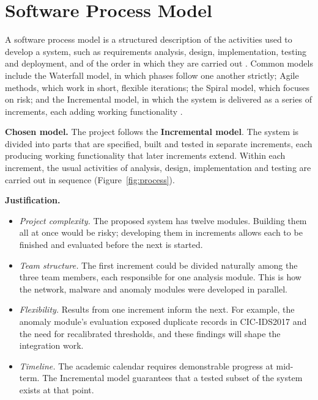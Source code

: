 \section{Software Process Model}

A software process model is a structured description of the activities used to develop a system, such as requirements analysis, design, implementation, testing and deployment, and of the order in which they are carried out \cite{sommerville2016se}. Common models include the Waterfall model, in which phases follow one another strictly; Agile methods, which work in short, flexible iterations; the Spiral model, which focuses on risk; and the Incremental model, in which the system is delivered as a series of increments, each adding working functionality \cite{sommerville2016se,larman2003iterative}.

\textbf{Chosen model.} The project follows the \textbf{Incremental model}. The system is divided into parts that are specified, built and tested in separate increments, each producing working functionality that later increments extend. Within each increment, the usual activities of analysis, design, implementation and testing are carried out in sequence (Figure~\ref{fig:process}).

\textbf{Justification.}
\begin{itemize}[itemsep=1pt, topsep=2pt]
  \item \textit{Project complexity.} The proposed system has twelve modules. Building them all at once would be risky; developing them in increments allows each to be finished and evaluated before the next is started.
  \item \textit{Team structure.} The first increment could be divided naturally among the three team members, each responsible for one analysis module. This is how the network, malware and anomaly modules were developed in parallel.
  \item \textit{Flexibility.} Results from one increment inform the next. For example, the anomaly module's evaluation exposed duplicate records in CIC-IDS2017 and the need for recalibrated thresholds, and these findings will shape the integration work.
  \item \textit{Timeline.} The academic calendar requires demonstrable progress at mid-term. The Incremental model guarantees that a tested subset of the system exists at that point.
\end{itemize}

